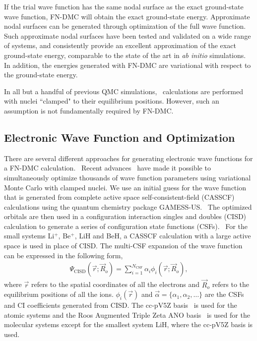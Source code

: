 If the trial wave function has the same nodal surface as the exact ground-state wave function, FN-DMC will obtain the exact ground-state energy.  Approximate nodal surfaces can be generated through optimization of the full wave function. Such approximate nodal surfaces have been tested and validated on a wide range of systems, and consistently provide an excellent approximation of the exact ground-state energy, comparable to the state of the art in \textit{ab initio} simulations.~\cite{grossman1} In addition, the energies generated with FN-DMC are variational with respect to the ground-state energy.

In all but a handful of previous QMC simulations,~\cite{Ceperley_1987,Natoli_1993,Natoli_1995,Chen_1995,Coldwell_H2_2008,Gabriele_H2_2004,Sandro_finiteT-noBO_2012} calculations are performed with nuclei ``clamped" to their equilibrium positions. However, such an assumption is not fundamentally required by FN-DMC. %

\subsection{Electronic Wave Function and Optimization}

There are several different approaches for generating electronic wave functions for a FN-DMC calculation.~\cite{Umrigar_Alleviation,Toulouse_Bench,Brown_Bench,Seth_Bench} Recent advances~\cite{Nightingale_Linear,Umrigar_Linear,Brown_Bench} have made it possible to simultaneously optimize thousands of wave function parameters using variational Monte Carlo with clamped nuclei. We use an initial guess for the wave function that is generated from complete active space self-consistent-field (CASSCF)~\cite{Chaban_MCSCF,Szabo} calculations using the quantum chemistry package GAMESS-US.~\cite{GAMESS} The optimized orbitals are then used in a configuration interaction singles and doubles (CISD) calculation to generate a series of configuration state functions (CSFs).~\cite{Pauncz_CSF} For the small systems Li$^+$, Be$^+$, LiH and BeH, a CASSCF calculation with a large active space is used in place of CISD. The multi-CSF expansion of the wave function can be expressed in the following form,
\begin{align}
\Psi_{\text{CISD}}(\vec{r};\vec{R}_o)=\sum\limits_{i=1}^{N_{\text{CSF}}}\alpha_i\phi_i(\vec{r};\vec{R}_o), \label{eq:psi_gms}
\end{align}
where $\vec{r}$ refers to the spatial coordinates of all the electrons and $\vec{R}_o$ refers to the equilibrium positions of all the ions. $\phi_i(\vec{r})$ and $\vec{\alpha}=\{\alpha_1,\alpha_2,\dots\}$ are the CSFs and CI coefficients generated from CISD. The cc-pV5Z basis~\cite{dunning} is used for the atomic systems and the Roos Augmented Triple Zeta ANO basis~\cite{roos} is used for the molecular systems except for the smallest system LiH, where the cc-pV5Z basis is used.

